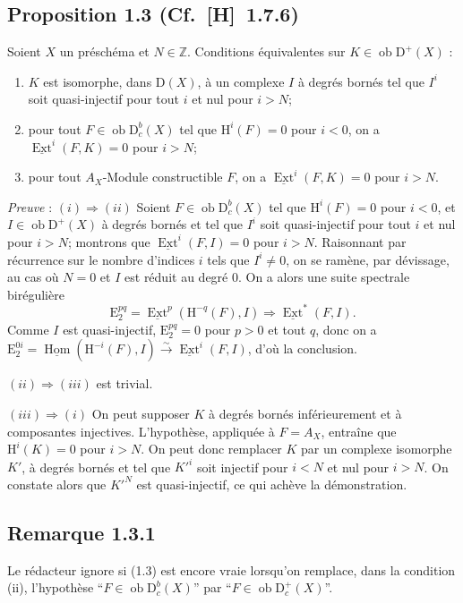 \documentclass[11pt]{article}
\renewcommand{\H}{\mathrm{H}}
\DeclareMathOperator{\Hom}{Hom}
\DeclareMathOperator{\Ext}{Ext}
\newcommand{\D}{\mathrm{D}}
\newcommand{\Z}{\mathbb{Z}}
\newcommand{\E}{\mathrm{E}}
\newcommand{\ob}{\operatorname{ob}}
\providecommand{\Hom}{\operatorname{Hom}}
\providecommand{\ob}{\operatorname{ob}}
\providecommand{\Z}{\mathbb Z}
\providecommand{\Hom}{\operatorname{Hom}}
\begin{document}
\subsection*{Proposition 1.3 {\normalfont (Cf.~[H]~1.7.6)}}
Soient $X$ un préschéma et $N \in \Z$. Conditions équivalentes sur $K \in \ob \D^{+}(X)$ :
\begin{enumerate}[label=(\roman*)]
\item $K$ est isomorphe, dans $\D(X)$, à un complexe $I$ à degrés bornés tel que $I^i$ soit quasi-injectif pour tout $i$ et nul pour $i > N$;
\item pour tout $F \in \ob \D_c^{b}(X)$ tel que $\H^i(F) = 0$ pour $i < 0$, on a $\underline{\Ext}^i(F,K) = 0$ pour $i > N$;
\item pour tout $A_X$-Module constructible $F$, on a $\underline{\Ext}^i(F,K) = 0$ pour $i > N$.
\end{enumerate}

\emph{Preuve} : $(i) \Rightarrow (ii)$ Soient $F \in \ob \D_c^{b}(X)$ tel que $\H^i(F) = 0$ pour $i < 0$, et $I \in \ob \D^{+}(X)$ à degrés bornés et tel que $I^i$ soit quasi-injectif pour tout $i$ et nul pour $i > N$; montrons que $\underline{\Ext}^i(F,I) = 0$ pour $i > N$. Raisonnant par récurrence sur le nombre d'indices $i$ tels que $I^i \neq 0$, on se ramène, par dévissage, au cas où $N = 0$ et $I$ est réduit au degré $0$. On a alors une suite spectrale birégulière
\[
\E_2^{pq} = \underline{\Ext}^p(\H^{-q}(F),I) \Rightarrow \underline{\Ext}^{*}(F,I).
\]
Comme $I$ est quasi-injectif, $\E_2^{pq} = 0$ pour $p > 0$ et tout $q$, donc on a $\E_2^{0i} = \underline{\Hom}(\H^{-i}(F),I) \xrightarrow{\sim} \underline{\Ext}^i(F,I)$, d'où la conclusion.

$(ii) \Rightarrow (iii)$ est trivial.

$(iii) \Rightarrow (i)$ On peut supposer $K$ à degrés bornés inférieurement et à
composantes injectives. L'hypothèse, appliquée à $F = A_X$, entraîne que $\H^i(K) = 0$ pour $i > N$. On peut donc remplacer $K$ par un complexe isomorphe $K'$, à degrés bornés et tel que $K'^i$ soit injectif pour $i < N$ et nul pour $i > N$. On constate alors que $K'^N$ est quasi-injectif, ce qui achève la démonstration.

\subsection*{Remarque 1.3.1}
Le rédacteur ignore si (1.3) est encore vraie lorsqu'on remplace, dans la condition (ii), l'hypothèse ``$F \in \ob \D_c^{b}(X)$'' par ``$F \in \ob \D_c^{+}(X)$''.
\end{document}
